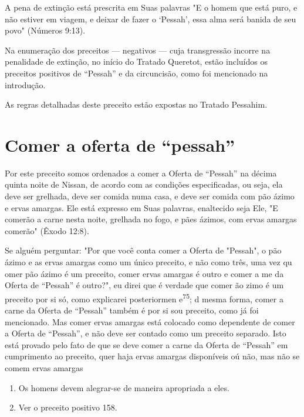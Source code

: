 A pena de extinção está prescrita em Suas palavras "E o homem que está
puro, e não estiver em viagem, e deixar de fazer o `Pessah', essa alma
será banida de seu povo" (Números 9:13).

Na enumeração dos preceitos --- negativos --- cuja transgressão in­corre
na penalidade de extinção, no início do Tratado Queretot, estão
incluí­dos os preceitos positivos de ``Pessah'' e da circuncisão, como foi
mencionado na introdução.


As regras detalhadas deste preceito estão expostas no Tratado Pessahim.


\section{Comer a oferta de ``pessah''}

Por este preceito somos ordenados a comer a Oferta de ``Pessah'' na décima
quinta noite de Nissan, de acordo com as condições especificadas, ou
seja, ela deve ser grelhada, deve ser comida numa casa, e deve ser
comida com pão ázimo e ervas amargas. Ele está expresso em Suas
palavras, enaltecido seja Ele, "E comerão a carne nesta noite, grelhada
no fogo, e pães ázimos, com ervas amargas comerão" (Êxodo 12:8).

Se alguém perguntar: "Por que você conta comer a Oferta de "Pes­sah", o
pão ázimo e as ervas amargas como um único preceito, e não como três,
uma vez qu omer pão ázimo é um preceito, comer ervas amargas é ou­tro e
comer a me da Oferta de ``Pessah'' é outro?", eu direi que é verdade que
comer ão zimo é um preceito por si só, como explicarei posteriormen
e\textsuperscript{75}; d mesma forma, comer a carne da Oferta de
``Pessah'' tam­bém é por si sou preceito, como já foi mencionado. Mas
comer ervas amar­gas está colocado como dependente de comer a Oferta de
``Pessah'', e não de­ve ser contado como um preceito separado. Isto está
provado pelo fato de que se deve comer a carne da Oferta de ``Pessah'' em
cumprimento ao preceito, quer haja ervas amargas disponíveis oú não, mas
não se comem ervas amargas


\begin{enumerate}
\def\labelenumi{\arabic{enumi}.}
\setcounter{enumi}{73}
\item
 
 Os homens devem alegrar-se de maneira apropriada a eles.
 
\item
 
 Ver o preceito positivo 158.
 
\end{enumerate}

